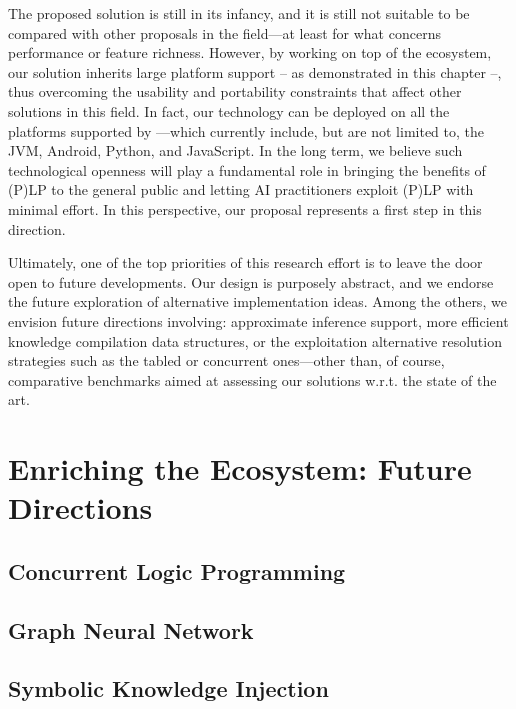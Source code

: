 \documentclass[12pt,a4paper,openright,twoside]{book}
\begin{document}
The proposed solution is still in its infancy, and it is still not suitable to be compared with other proposals in the field---at least for what concerns performance or feature richness.
%
However, by working on top of the \twopkt{} ecosystem, our solution inherits large platform support -- as demonstrated in this chapter --, thus overcoming the usability and portability constraints that affect other solutions in this field.
%
In fact, our technology can be deployed on all the platforms supported by \twopkt{}---which currently include, but are not limited to, the JVM, Android, Python, and JavaScript.
%
In the long term, we believe such technological openness will play a fundamental role in bringing the benefits of (P)LP to the general public and letting AI practitioners exploit (P)LP with minimal effort.
%
In this perspective, our proposal represents a first step in this direction.

Ultimately, one of the top priorities of this research effort is to leave the door open to future developments.
%
Our design is purposely abstract, and we endorse the future exploration of alternative implementation ideas.
%
Among the others, we envision future directions involving: approximate inference support, more efficient knowledge compilation data structures, or the exploitation alternative resolution strategies such as the tabled or concurrent ones---other than, of course, comparative benchmarks aimed at assessing our solutions w.r.t. the state of the art.

\chapter{Enriching the Ecosystem: Future Directions}


\section{Concurrent Logic Programming}


\section{Graph Neural Network}


\section{Symbolic Knowledge Injection}
\end{document}
